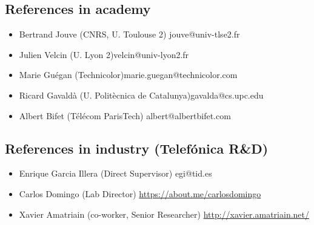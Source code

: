 \documentclass[11pt,a4paper,sans]{moderncv}        %
\begin{document}
\subsection{References in academy}
  \begin{itemize}
  \item Bertrand Jouve (CNRS, U. Toulouse 2) \hfill jouve@univ-tlse2.fr                            
  \item Julien Velcin (U. Lyon 2)\hfill velcin@univ-lyon2.fr
  \item Marie Guégan (Technicolor)\hfill marie.guegan@technicolor.com
  \item Ricard Gavaldà (U. Politècnica de Catalunya)\hfill gavalda@cs.upc.edu
  \item Albert Bifet (Télécom ParisTech) \hfill albert@albertbifet.com
  \end{itemize}
\subsection{References in industry (Telefónica R\&D)}
\begin{itemize}
\item Enrique Garcia Illera (Direct Supervisor) \hfill egi@tid.es 
\item Carlos Domingo (Lab Director) \hfill \url{https://about.me/carlosdomingo}
\item Xavier Amatriain (co-worker, Senior Researcher) \hfill \url{http://xavier.amatriain.net/}
\end{itemize}
\end{document}
